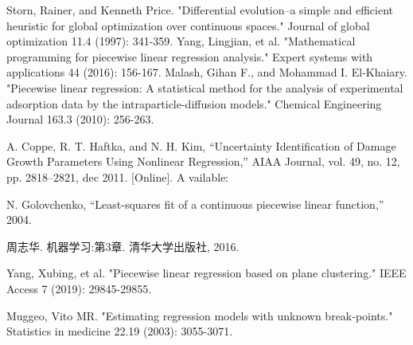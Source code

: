 \begin{thebibliography}{99}  
 Storn, Rainer, and Kenneth Price. "Differential evolution–a simple and efficient heuristic for global optimization over continuous spaces." Journal of global optimization 11.4 (1997): 341-359.
 Yang, Lingjian, et al. "Mathematical programming for piecewise linear regression analysis." Expert systems with applications 44 (2016): 156-167.
 Malash, Gihan F., and Mohammad I. El-Khaiary. "Piecewise linear regression: A statistical method for the analysis of experimental adsorption data by the intraparticle-diffusion models." Chemical Engineering Journal 163.3 (2010): 256-263.

 A. Coppe, R. T. Haftka, and N. H. Kim, “Uncertainty Identification of
Damage Growth Parameters Using Nonlinear Regression,” AIAA Journal,
vol. 49, no. 12, pp. 2818–2821, dec 2011. [Online]. A vailable:

 N. Golovchenko, “Least-squares fit of a continuous piecewise linear function,”
2004.

 周志华. 机器学习:第3章. 清华大学出版社, 2016.

 Yang, Xubing, et al. "Piecewise linear regression based on plane clustering." IEEE Access 7 (2019): 29845-29855.

 Muggeo, Vito MR. "Estimating regression models with unknown break‐points." Statistics in medicine 22.19 (2003): 3055-3071.


\end{thebibliography}